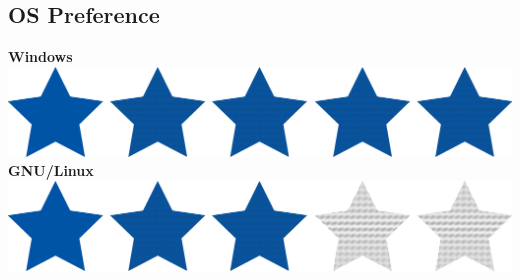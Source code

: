 \documentclass[a4paper]{./classes/friggeri-cv}
\begin{document}
\begin{aside}
        \section{OS Preference}\label{sec:os-preference}
        \textbf{Windows}\includegraphics[scale=0.33]{../assets/images/stars/5stars.png}
        \textbf{GNU/Linux}\includegraphics[scale=0.33]{../assets/images/stars/3stars.png}
        ~
    \end{aside}
    ~
\end{document}
